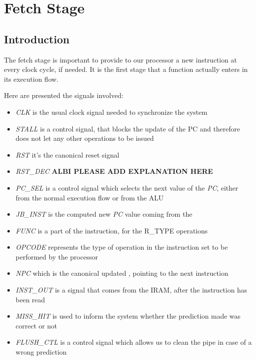 \section{Fetch Stage}
\label{chap_ft}

\subsection{Introduction}
The fetch stage is important to provide to our processor a new instruction at every clock cycle, if needed. It is the first stage that a function actually enters in its execution flow.

Here are presented the signals involved:
\begin{itemize}
	\item \textit{CLK} is the usual clock signal needed to synchronize the system
	\item \textit{STALL} is a control signal, that blocks the update of the \textsf{PC} and therefore does not let any other operations to be issued
	\item \textit{RST} it's the canonical reset signal
	\item \textit{RST\_DEC} \textbf{ALBI PLEASE ADD EXPLANATION HERE}
	\item \textit{PC\_SEL} is a control signal which selects the next value of the \textit{PC}, either from the normal execution flow or from the ALU
	\item \textit{JB\_INST} is the computed new \textit{PC} value coming from the \alu
	\item \textit{FUNC} is a part of the instruction, for the \textsc{R\_TYPE} operations
	\item \textit{OPCODE} represents the type of operation in the instruction set to be performed by the processor
	\item \textit{NPC} which is the canonical updated \pc, pointing to the next instruction
	\item \textit{INST\_OUT} is a signal that comes from the IRAM, after the instruction has been read
	\item \textit{MISS\_HIT} is used to inform the system whether the prediction made was correct or not
	\item \textit{FLUSH\_CTL} is a control signal which allows us to clean the pipe in case of a wrong prediction
\end{itemize}

